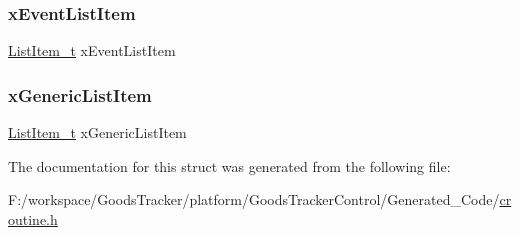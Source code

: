 \subsubsection{\texorpdfstring{x\+Event\+List\+Item}{xEventListItem}}
{\footnotesize\ttfamily \hyperlink{list_8h_a1a62d469392f9bfe2443e7efab9c8398}{List\+Item\+\_\+t} x\+Event\+List\+Item}

\mbox{\label{structcor_co_routine_control_block_ad91115e6e382ba8961310c4559abc7d2}} 
\subsubsection{\texorpdfstring{x\+Generic\+List\+Item}{xGenericListItem}}
{\footnotesize\ttfamily \hyperlink{list_8h_a1a62d469392f9bfe2443e7efab9c8398}{List\+Item\+\_\+t} x\+Generic\+List\+Item}



The documentation for this struct was generated from the following file\+:\begin{DoxyCompactItemize}
\item 
F\+:/workspace/\+Goods\+Tracker/platform/\+Goods\+Tracker\+Control/\+Generated\+\_\+\+Code/\hyperlink{croutine_8h}{croutine.\+h}\end{DoxyCompactItemize}
